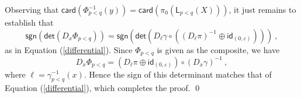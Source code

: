 \documentclass{article}
\newcommand{\msf}[1]{\mathsf{#1}}
\newcommand{\card}{\msf{card}}
\theoremstyle{definition}
\begin{document}
Observing that $\card(\Phi_{p<q}^{-1}(y)) = \card(\pi_0(\msf{L}_{p<q}(X)))$, it just remains to establish that 
$$\msf{sgn}(\msf{det}(D_x \Phi_{p<q})) = \msf{sgn}(\msf{det}(D_\ell \gamma \circ ((D_\ell \pi)^{-1} \oplus 
    \msf{id}_{(0,\varepsilon)})))~,$$
as in Equation (\ref{differential}). Since $\Phi_{p<q}$ is given as the composite, we have
$$D_x \Phi_{p<q} = (D_\ell \pi \oplus \msf{id}_{(0,\varepsilon)}) \circ (D_x \gamma)^{-1}~,$$
where $\ell = \gamma^{-1}_{p<q}(x)$. Hence the sign of this determinant matches that of Equation 
(\ref{differential}), which completes the proof.
\qed \\
\end{document}
